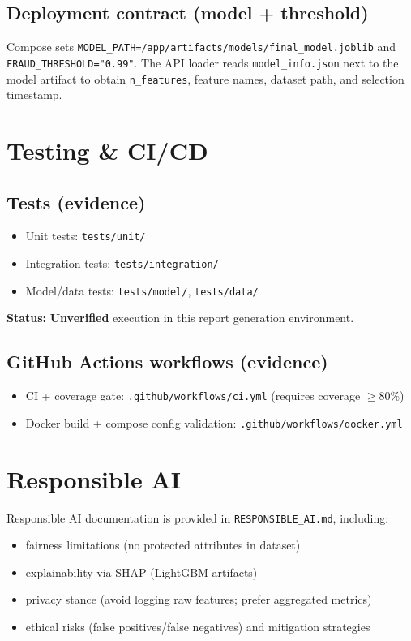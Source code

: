 \documentclass[11pt]{article}
\newcommand{\code}[1]{\texttt{#1}}
\newcommand{\statusunverified}{\textbf{Unverified}}
\begin{document}
\subsection{Deployment contract (model + threshold)}
Compose sets \code{MODEL_PATH=/app/artifacts/models/final_model.joblib} and \code{FRAUD_THRESHOLD="0.99"}. The API loader reads \code{model_info.json} next to the model artifact to obtain \code{n_features}, feature names, dataset path, and selection timestamp.

\section{Testing \& CI/CD}
\subsection{Tests (evidence)}
\begin{itemize}
  \item Unit tests: \code{tests/unit/}
  \item Integration tests: \code{tests/integration/}
  \item Model/data tests: \code{tests/model/}, \code{tests/data/}
\end{itemize}
\textbf{Status:} \statusunverified{} execution in this report generation environment.

\subsection{GitHub Actions workflows (evidence)}
\begin{itemize}
  \item CI + coverage gate: \code{.github/workflows/ci.yml} (requires coverage \(\ge 80\%\))
  \item Docker build + compose config validation: \code{.github/workflows/docker.yml}
\end{itemize}

\section{Responsible AI}
Responsible AI documentation is provided in \code{RESPONSIBLE_AI.md}, including:
\begin{itemize}
  \item fairness limitations (no protected attributes in dataset)
  \item explainability via SHAP (LightGBM artifacts)
  \item privacy stance (avoid logging raw features; prefer aggregated metrics)
  \item ethical risks (false positives/false negatives) and mitigation strategies
\end{itemize}
\end{document}
